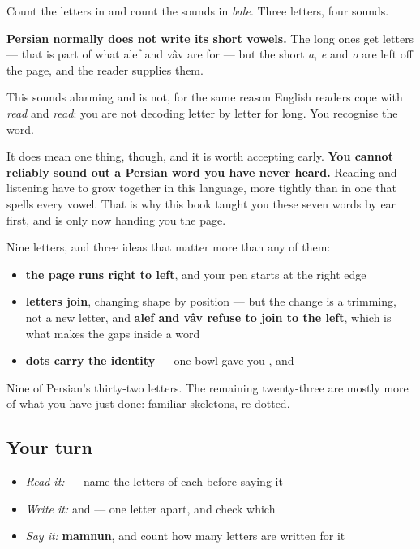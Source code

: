 \begin{culture}
Count the letters in \textbf{} and count the sounds in \emph{bale}. Three letters, four sounds.

\textbf{Persian normally does not write its short vowels.} The long ones get letters — that is part of what alef and vâv are for — but the short \emph{a}, \emph{e} and \emph{o} are left off the page, and the reader supplies them.

This sounds alarming and is not, for the same reason English readers cope with \emph{read} and \emph{read}: you are not decoding letter by letter for long. You recognise the word.

It does mean one thing, though, and it is worth accepting early. \textbf{You cannot reliably sound out a Persian word you have never heard.} Reading and listening have to grow together in this language, more tightly than in one that spells every vowel. That is why this book taught you these seven words by ear first, and is only now handing you the page.
\end{culture}

\begin{grammarlens}[title={What you've built this chapter}]
Nine letters, and three ideas that matter more than any of them:

\begin{itemize}
\raggedright
  \item \textbf{the page runs right to left}, and your pen starts at the right edge
  \item \textbf{letters join}, changing shape by position — but the change is a trimming, not a new letter, and \textbf{alef and vâv refuse to join to the left}, which is what makes the gaps inside a word
  \item \textbf{dots carry the identity} — one bowl gave you ,  and 
\end{itemize}

Nine of Persian's thirty-two letters. The remaining twenty-three are mostly more of what you have just done: familiar skeletons, re-dotted.
\end{grammarlens}

\subsection*{Your turn}
\begin{itemize}
\raggedright
  \item \emph{Read it:}     — name the letters of each before saying it
  \item \emph{Write it:}  and  — one letter apart, and check which
  \item \emph{Say it:} \textbf{mamnun}, and count how many letters are written for it
\end{itemize}

